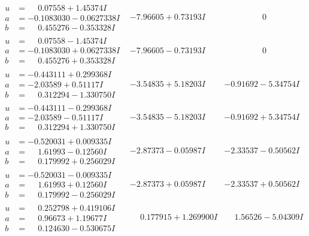 \documentclass[1p]{elsarticle_modified}
\theoremstyle{definition}
\begin{document}
$$\begin{array}{c|c|c}
\begin{aligned}
u &= \phantom{-}0.07558 + 1.45374 I \\
a &= -0.1083030 - 0.0627338 I \\
b &= \phantom{-}0.455276 - 0.353328 I\end{aligned}
 & -7.96605 + 0.73193 I & \phantom{-0.000000 } 0 \\ \hline\begin{aligned}
u &= \phantom{-}0.07558 - 1.45374 I \\
a &= -0.1083030 + 0.0627338 I \\
b &= \phantom{-}0.455276 + 0.353328 I\end{aligned}
 & -7.96605 - 0.73193 I & \phantom{-0.000000 } 0 \\ \hline\begin{aligned}
u &= -0.443111 + 0.299368 I \\
a &= -2.03589 + 0.51117 I \\
b &= \phantom{-}0.312294 - 1.330750 I\end{aligned}
 & -3.54835 + 5.18203 I & -0.91692 - 5.34754 I \\ \hline\begin{aligned}
u &= -0.443111 - 0.299368 I \\
a &= -2.03589 - 0.51117 I \\
b &= \phantom{-}0.312294 + 1.330750 I\end{aligned}
 & -3.54835 - 5.18203 I & -0.91692 + 5.34754 I \\ \hline\begin{aligned}
u &= -0.520031 + 0.009335 I \\
a &= \phantom{-}1.61993 - 0.12560 I \\
b &= \phantom{-}0.179992 + 0.256029 I\end{aligned}
 & -2.87373 - 0.05987 I & -2.33537 - 0.50562 I \\ \hline\begin{aligned}
u &= -0.520031 - 0.009335 I \\
a &= \phantom{-}1.61993 + 0.12560 I \\
b &= \phantom{-}0.179992 - 0.256029 I\end{aligned}
 & -2.87373 + 0.05987 I & -2.33537 + 0.50562 I \\ \hline\begin{aligned}
u &= \phantom{-}0.252798 + 0.419106 I \\
a &= \phantom{-}0.96673 + 1.19677 I \\
b &= \phantom{-}0.124630 - 0.530675 I\end{aligned}
 & \phantom{-}0.177915 + 1.269900 I & \phantom{-}1.56526 - 5.04309 I \\ \hline\begin{aligned}

\end{aligned}
\end{array}$$
\end{document}
